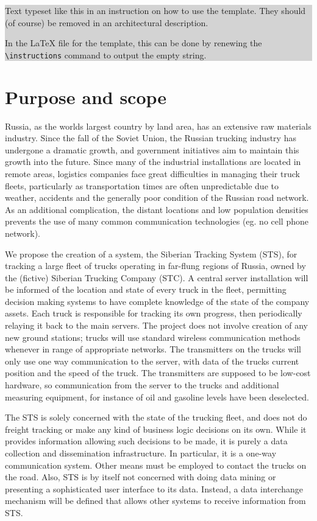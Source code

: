 \documentclass[a4paper,11pt]{report}
\newcommand{\instructions}[1]{
  \noindent\colorbox{lightgray}{%
    \parbox{\linewidth}{%
      #1
    }%
  }%
 \vspace{0.1cm}
}
\begin{document}
\instructions{Text typeset like this in an instruction on how to use
  the template. They should (of course) be removed in an architectural
  description. 

  In the LaTeX file for the template, this can be done by renewing the
  \texttt{{\textbackslash}instructions} command to output the empty string.
}

\section{Purpose and scope}
\label{sec:purpose-scope}

Russia, as the worlds largest country by land area, has an extensive
raw materials industry.  Since the fall of the Soviet Union, the
Russian trucking industry has undergone a dramatic growth, and
government initiatives aim to maintain this growth into the future.
Since many of the industrial installations are located in remote
areas, logistics companies face great difficulties in managing their
truck fleets, particularly as transportation times are often
unpredictable due to weather, accidents and the generally poor
condition of the Russian road network.  As an additional complication,
the distant locations and low population densities prevents the use of
many common communication technologies (eg. no cell phone network).

We propose the creation of a system, the Siberian Tracking System
(STS), for tracking a large fleet of trucks operating in far-flung
regions of Russia, owned by the (fictive) Siberian Trucking Company
(STC).  A central server installation will be informed of the location
and state of every truck in the fleet, permitting decision making
systems to have complete knowledge of the state of the company assets.
Each truck is responsible for tracking its own progress, then
periodically relaying it back to the main servers.  The project does
not involve creation of any new ground stations; trucks will use
standard wireless communication methods whenever in range of
appropriate networks. The transmitters on the trucks will only use one way communication to the server, with data of the trucks current position and the speed of the truck. The transmitters are supposed to be low-cost hardware, so communication from the server to the trucks and additional measuring equipment, for instance of oil and gasoline levels have been deselected. 

The STS is solely concerned with the state of the trucking fleet, and
does not do freight tracking or make any kind of business logic
decisions on its own.  While it provides information allowing such
decisions to be made, it is purely a data collection and dissemination
infrastructure.  In particular, it is a one-way communication system.
Other means must be employed to contact the trucks on the road.  Also,
STS is by itself not concerned with doing data mining or presenting a
sophisticated user interface to its data.  Instead, a data interchange
mechanism will be defined that allows other systems to receive
information from STS.
\end{document}
